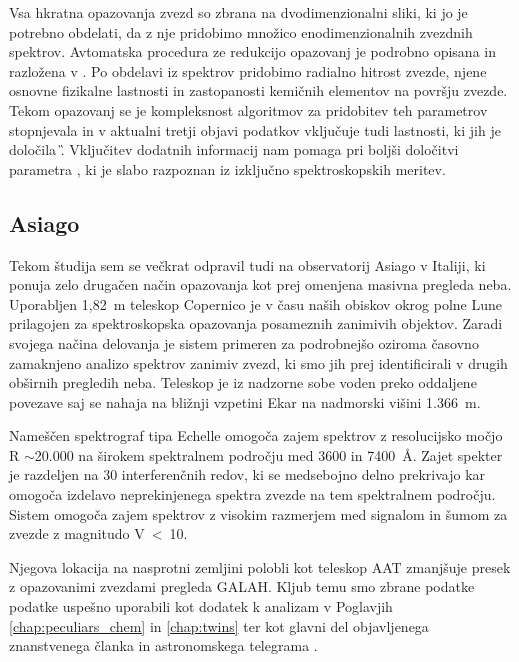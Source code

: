 Vsa hkratna opazovanja zvezd so zbrana na dvodimenzionalni sliki, ki jo je potrebno obdelati, da z nje pridobimo množico enodimenzionalnih zvezdnih spektrov. Avtomatska procedura ze redukcijo opazovanj je podrobno opisana in razložena v \citet{2017MNRAS.464.1259K}. Po obdelavi iz spektrov pridobimo radialno hitrost zvezde, njene osnovne fizikalne lastnosti in zastopanosti kemičnih elementov na površju zvezde. Tekom opazovanj se je kompleksnost algoritmov za pridobitev teh parametrov stopnjevala in v aktualni tretji objavi podatkov vključuje tudi lastnosti, ki jih je določila \G. Vključitev dodatnih informacij nam pomaga pri boljši določitvi parametra \Logg, ki je slabo razpoznan iz izključno spektroskopskih meritev.

\subsection{Asiago}
\label{sec:slo_asiago}
Tekom študija sem se večkrat odpravil tudi na observatorij Asiago v Italiji, ki ponuja zelo drugačen način opazovanja kot prej omenjena masivna pregleda neba. Uporabljen 1,82~m teleskop Copernico je v času naših obiskov okrog polne Lune prilagojen za spektroskopska opazovanja posameznih zanimivih objektov. Zaradi svojega načina delovanja je sistem primeren za podrobnejšo oziroma časovno zamaknjeno analizo spektrov zanimiv zvezd, ki smo jih prej identificirali v drugih obširnih pregledih neba. Teleskop je iz nadzorne sobe voden preko oddaljene povezave saj se nahaja na bližnji vzpetini Ekar na nadmorski višini 1.366~m. 

Nameščen spektrograf tipa Echelle omogoča zajem spektrov z resolucijsko močjo R $\sim$20.000 na širokem spektralnem področju med 3600 in 7400~\AA. Zajet spekter je razdeljen na 30 interferenčnih redov, ki se medsebojno delno prekrivajo kar omogoča izdelavo neprekinjenega spektra zvezde na tem spektralnem področju. Sistem omogoča zajem spektrov z visokim razmerjem med signalom in šumom za zvezde z magnitudo V~<~10. 

Njegova lokacija na nasprotni zemljini polobli kot teleskop AAT zmanjšuje presek z opazovanimi zvezdami pregleda GALAH. Kljub temu smo zbrane podatke podatke uspešno uporabili kot dodatek k analizam v Poglavjih \ref{chap:peculiars_chem} in \ref{chap:twins} ter kot glavni del objavljenega znanstvenega članka \cite{2019MNRAS.488.5536M} in astronomskega telegrama \cite{2019ATel13340....1M}.

